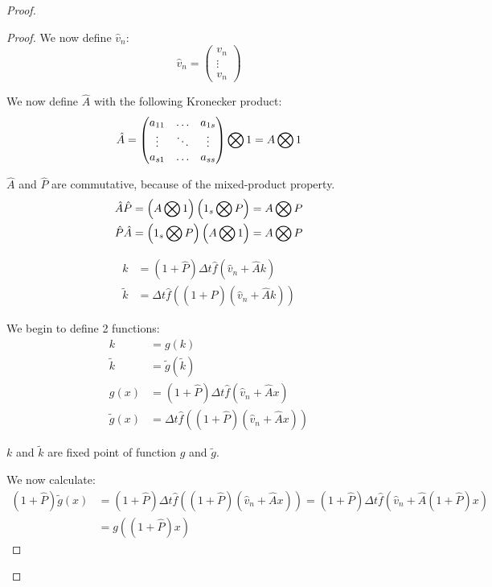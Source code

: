 \begin{proof}
\begin{proof}
We now define $\hat{v}_n$:
\begin{equation}
\hat{v}_{n}=\begin{pmatrix}
	      v_{n}\\
	      \vdots\\
	      v_{n}
	      \end{pmatrix}
\end{equation}

We now define $\hat{A}$ with the following Kronecker product:
\begin{equation}
\hat{A}=\begin{pmatrix}
    a_{11}	&\ldots	&a_{1s}\\
    \vdots	&\ddots	&\vdots\\
    a_{s1}	&\ldots	&a_{ss}\\
  \end{pmatrix} \bigotimes 1=A \bigotimes 1
\end{equation}

$\hat{A}$ and $\hat{P}$ are commutative, because of the mixed-product property.
\begin{align}
\hat{A}\hat{P}&=\left(A\bigotimes 1 \right)
  \left(1_{s}\bigotimes P\right)=
	A\bigotimes P\\
    \hat{P}\hat{A}&=
  \left(1_{s}\bigotimes P\right)
	\left(A \bigotimes 1 \right)=
	A\bigotimes P
\end{align}

\begin{align}
k&=(1+\hat{P})\Delta t\hat{f}(\hat{v}_{n}+\hat{A}k)\\
\tilde{k}&=\Delta t \hat{f}((1+\hat{P})(\hat{v}_{n}+\hat{A}k))
\end{align}

We begin to define 2 functions:
\begin{align}
k&=g(k)\\
\tilde{k}&=\tilde{g}(\tilde{k})\\
g(x)&=(1+\hat{P})\Delta t \hat{f}(\hat{v}_{n}+\hat{A}x)\\
\tilde{g}(x)&=\Delta t \hat{f}((1+\hat{P})(\hat{v}_{n}+\hat{A}x))
\end{align}

$k$ and $\tilde{k}$ are fixed point of function $g$ and $\tilde{g}$.

We now calculate:
\begin{align}
(1+\hat{P})\tilde{g}(x)&=(1+\hat{P})\Delta t \hat{f}((1+\hat{P})(\hat{v}_{n}+\hat{A}x))=(1+\hat{P})\Delta t \hat{f}(\hat{v}_{n}+\hat{A} (1+\hat{P})x)\\
&=g((1+\hat{P})x)
\end{align}


\end{proof}
\end{proof}
